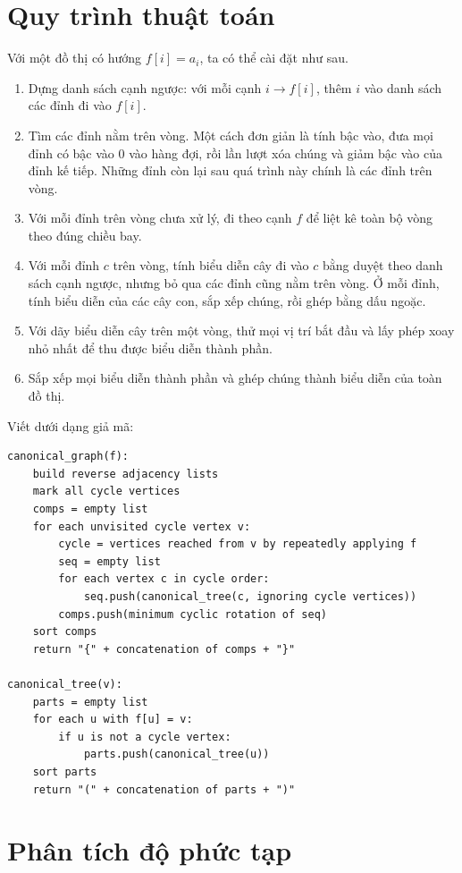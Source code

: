 \documentclass[11pt]{article}
\begin{document}
\section{Quy trình thuật toán}

Với một đồ thị có hướng \(f[i]=a_i\), ta có thể cài đặt như sau.

\begin{enumerate}
  \item Dựng danh sách cạnh ngược: với mỗi cạnh \(i\to f[i]\), thêm \(i\) vào
  danh sách các đỉnh đi vào \(f[i]\).
  \item Tìm các đỉnh nằm trên vòng. Một cách đơn giản là tính bậc vào, đưa mọi
  đỉnh có bậc vào \(0\) vào hàng đợi, rồi lần lượt xóa chúng và giảm bậc vào
  của đỉnh kế tiếp. Những đỉnh còn lại sau quá trình này chính là các đỉnh
  trên vòng.
  \item Với mỗi đỉnh trên vòng chưa xử lý, đi theo cạnh \(f\) để liệt kê toàn
  bộ vòng theo đúng chiều bay.
  \item Với mỗi đỉnh \(c\) trên vòng, tính biểu diễn cây đi vào \(c\) bằng
  duyệt theo danh sách cạnh ngược, nhưng bỏ qua các đỉnh cũng nằm trên vòng.
  Ở mỗi đỉnh, tính biểu diễn của các cây con, sắp xếp chúng, rồi ghép bằng
  dấu ngoặc.
  \item Với dãy biểu diễn cây trên một vòng, thử mọi vị trí bắt đầu và lấy
  phép xoay nhỏ nhất để thu được biểu diễn thành phần.
  \item Sắp xếp mọi biểu diễn thành phần và ghép chúng thành biểu diễn của
  toàn đồ thị.
\end{enumerate}

Viết dưới dạng giả mã:

\begin{verbatim}
canonical_graph(f):
    build reverse adjacency lists
    mark all cycle vertices
    comps = empty list
    for each unvisited cycle vertex v:
        cycle = vertices reached from v by repeatedly applying f
        seq = empty list
        for each vertex c in cycle order:
            seq.push(canonical_tree(c, ignoring cycle vertices))
        comps.push(minimum cyclic rotation of seq)
    sort comps
    return "{" + concatenation of comps + "}"

canonical_tree(v):
    parts = empty list
    for each u with f[u] = v:
        if u is not a cycle vertex:
            parts.push(canonical_tree(u))
    sort parts
    return "(" + concatenation of parts + ")"
\end{verbatim}

\section{Phân tích độ phức tạp}
\end{document}
